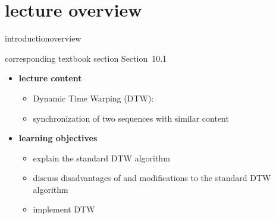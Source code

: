 


\subtitle{Module 10.1: Alignment~---~Dynamic Time Warping}


	

    \section[overview]{lecture overview}
        \begin{frame}{introduction}{overview}
            \begin{block}{corresponding textbook section}
                    Section~10.1
            \end{block}

            \begin{itemize}
                \item   \textbf{lecture content}
                    \begin{itemize}
                        \item   Dynamic Time Warping (DTW):
                        \item[] synchronization of two sequences with similar content
                    \end{itemize}
                \bigskip
                \item<2->   \textbf{learning objectives}
                    \begin{itemize}
                        \item   explain the standard DTW algorithm
                        \item   discuss disadvantages of and modifications to the standard DTW algorithm
                        \item   implement DTW
                    \end{itemize}
            \end{itemize}
        \end{frame}

